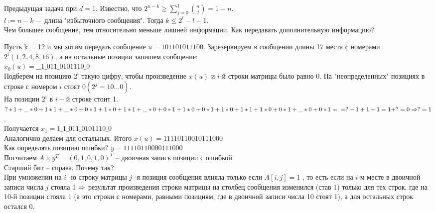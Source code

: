 
	Предыдущая задача при $d = 1$. Известно, что $\displaystyle 2^{n-k} \geqslant \sum_{j=0}^{1} \binom{n}{j} = 1+n$.\\
	$l := n - k -$ длина "избыточного сообщения". Тогда $k \leqslant 2^l - l - 1$.\\
	Чем большее сообщение, тем относительно меньше лишней информации. Как передавать дополнительную информацию?


	\begin{Example}
		Пусть k = 12  и мы хотим передать сообщение $u = 101101011100$. Зарезервируем в сообщении длины 17 места с номерами $2^i (1, 2, 4, 8, 16)$, а на остальные позиции запишем сообщение:\\ $x_0 (u) = \_ \_ 1 \_ 011 \_ 0101110 \_ 0$\\
		Подберём на позицию $2^i$ такую цифру, чтобы произведение $x(u)$ и $i$-й строки матрицы было равно 0. На "неопределенных" позициях в строке с номером $i$ стоят $0 (2^j = 10 \dots 0)$.\\
		На позиции $2^i$ в $i-$й строке стоит 1.\\
		$?*1+\_*0+1*1+\_*0+0*1+1*0+1*1+\_*0+0*1+1*0+0*1+1*0+1*1+1*0+0*1+\_*0+0*1 = \\ = ? + 1 + 1 + 1 = 1 + ? = 0 \Rightarrow ? = 1$.\\
		Получается $x_1 = 1\_1\_011\_0101110\_0$\\
		Аналогично делаем для остальных. Итого $x(u) = 11110110010111000$\\
		Как определять позицию ошибки? $y = 11110110000111000$\\
		Посчитаем $A \times y^{T} = (0, 1, 0, 1, 0)^{T}$ -- двоичная запись позиции с ошибкой.\\
		Старший бит -- справа. Почему так? \\
		
		При умножении на $i$ -ю строку матрицы $j$ -я позиция сообщения влияла
		только если $A[i, j] = 1$ , то есть если на $i$-м месте в двоичной записи
		числа $j$ стояла 1 $\Rightarrow$ результат произведения строки матрицы на столбец
		сообщения изменился (став 1) только для тех строк, где на 10-й позиции
		стояла 1 (а это строки с номерами, равными позициям, где в двоичной
		записи числа 10 стоят 1), а для остальных строк остался 0.
	\end{Example}



